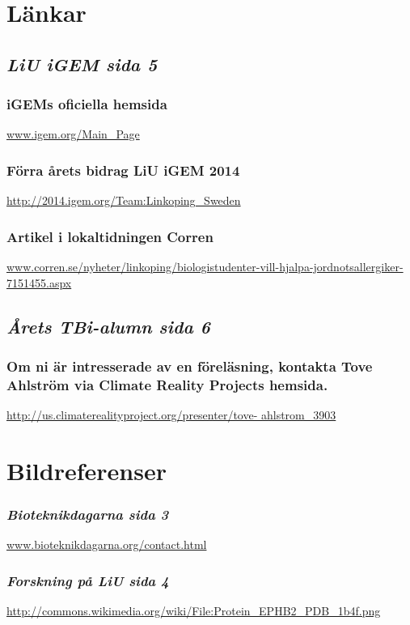 




\section*{\textbf{Länkar}}


\subsection*{\emph{LiU iGEM sida 5}}

\subsubsection*{iGEMs oficiella hemsida}
\url{www.igem.org/Main_Page}

\subsubsection*{Förra årets bidrag LiU iGEM 2014}
\url{http://2014.igem.org/Team:Linkoping_Sweden}

\subsubsection*{Artikel i lokaltidningen Corren}
\url{www.corren.se/nyheter/linkoping/biologistudenter-vill-hjalpa-jordnotsallergiker-7151455.aspx}

\subsection*{\emph{Årets TBi-alumn sida 6}}
\subsubsection*{Om ni är intresserade av en föreläsning, kontakta Tove Ahlström via Climate Reality Projects hemsida.} 
\url{http://us.climaterealityproject.org/presenter/tove-
ahlstrom_3903}
\\


\section*{Bildreferenser}

\subsubsection*{\emph{Bioteknikdagarna sida 3}}
\url{www.bioteknikdagarna.org/contact.html}


\subsubsection*{\emph{Forskning på LiU sida 4}}
\url{http://commons.wikimedia.org/wiki/File:Protein_EPHB2_PDB_1b4f.png}


